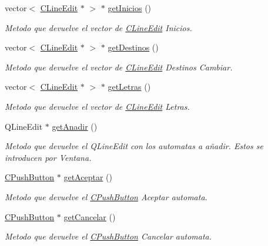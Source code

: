 \begin{DoxyCompactItemize}
vector$<$ \hyperlink{classCLineEdit}{C\+Line\+Edit} $\ast$ $>$ $\ast$ \hyperlink{classCAsistenteCodificacion_a6e18515302506ef6766a5a4bdbb64dfd}{get\+Inicios} ()
\begin{DoxyCompactList}\small\item\em Metodo que devuelve el vector de \hyperlink{classCLineEdit}{C\+Line\+Edit} Inicios. \end{DoxyCompactList}\item 
vector$<$ \hyperlink{classCLineEdit}{C\+Line\+Edit} $\ast$ $>$ $\ast$ \hyperlink{classCAsistenteCodificacion_a8e55263b52df54df6353f6a2ae4a88df}{get\+Destinos} ()
\begin{DoxyCompactList}\small\item\em Metodo que devuelve el vector de \hyperlink{classCLineEdit}{C\+Line\+Edit} Destinos Cambiar. \end{DoxyCompactList}\item 
vector$<$ \hyperlink{classCLineEdit}{C\+Line\+Edit} $\ast$ $>$ $\ast$ \hyperlink{classCAsistenteCodificacion_ae4e5d1b2a9830a026897bed772bfb49e}{get\+Letras} ()
\begin{DoxyCompactList}\small\item\em Metodo que devuelve el vector de \hyperlink{classCLineEdit}{C\+Line\+Edit} Letras. \end{DoxyCompactList}\item 
Q\+Line\+Edit $\ast$ \hyperlink{classCAsistenteCodificacion_a7714a288c08739425ed8cd4d927451e6}{get\+Anadir} ()
\begin{DoxyCompactList}\small\item\em Metodo que devuelve el Q\+Line\+Edit con los automatas a añadir. Estos se introducen por Ventana. \end{DoxyCompactList}\item 
\hyperlink{classCPushButton}{C\+Push\+Button} $\ast$ \hyperlink{classCAsistenteCodificacion_ac8253a5adbe02d45daf20afe4d7678f2}{get\+Aceptar} ()
\begin{DoxyCompactList}\small\item\em Metodo que devuelve el \hyperlink{classCPushButton}{C\+Push\+Button} Aceptar automata. \end{DoxyCompactList}\item 
\hyperlink{classCPushButton}{C\+Push\+Button} $\ast$ \hyperlink{classCAsistenteCodificacion_a4e1025d9e7c189d22a19d97474499ceb}{get\+Cancelar} ()
\begin{DoxyCompactList}\small\item\em Metodo que devuelve el \hyperlink{classCPushButton}{C\+Push\+Button} Cancelar automata. \end{DoxyCompactList}\item 

\end{DoxyCompactItemize}
